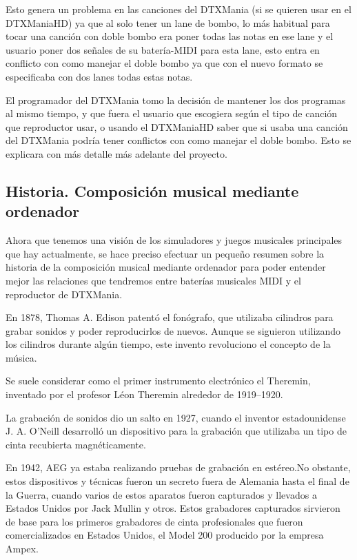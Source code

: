\documentclass[a4paper,11pt,oneside]{book}
\begin{document}
Esto genera un problema en las canciones del DTXMania (si se quieren usar en el DTXManiaHD) ya que al solo tener un lane de bombo, lo más habitual para tocar una canción con doble bombo era poner todas las notas en ese lane y el usuario poner dos señales de su batería-MIDI para esta lane, esto entra en conflicto con como manejar el doble bombo ya que con el nuevo formato se especificaba con dos lanes todas estas notas.

El programador del DTXMania tomo la decisión de mantener los dos programas al mismo tiempo, y que fuera el usuario que escogiera según el tipo de canción que reproductor usar, o usando el DTXManiaHD saber que si usaba una canción del DTXMania podría tener conflictos con como manejar el doble bombo. Esto se explicara con más detalle más adelante del proyecto.

\subsection{Historia. Composición musical mediante ordenador}
Ahora que tenemos una visión de los simuladores y juegos musicales principales que hay actualmente, se hace preciso efectuar un pequeño resumen sobre la historia de la composición musical mediante ordenador para poder entender mejor las relaciones que tendremos entre baterías musicales MIDI y el reproductor de DTXMania.

En 1878, Thomas A. Edison patentó el fonógrafo, que utilizaba cilindros para grabar sonidos y poder reproducirlos de nuevos. Aunque se siguieron utilizando los cilindros durante algún tiempo, este invento revoluciono el concepto de la música.

Se suele considerar como el primer instrumento electrónico el Theremin, inventado por el profesor Léon Theremin alrededor de 1919–1920.

La grabación de sonidos dio un salto en 1927, cuando el inventor estadounidense J. A. O'Neill desarrolló un dispositivo para la grabación que utilizaba un tipo de cinta recubierta magnéticamente.

En 1942, AEG ya estaba realizando pruebas de grabación en estéreo.No obstante, estos dispositivos y técnicas fueron un secreto fuera de Alemania hasta el final de la Guerra, cuando varios de estos aparatos fueron capturados y llevados a Estados Unidos por Jack Mullin y otros. Estos grabadores capturados sirvieron de base para los primeros grabadores de cinta profesionales que fueron comercializados en Estados Unidos, el Model 200 producido por la empresa Ampex.
\end{document}
